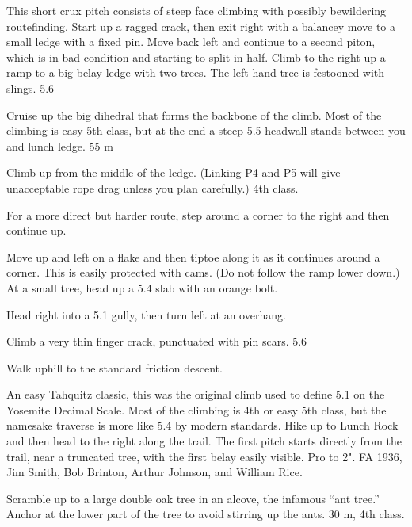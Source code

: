 \documentclass{tahquitz}
\begin{document}
 This short crux pitch consists of steep face climbing with
possibly bewildering routefinding. Start up a ragged crack, then
exit right with a balancey move to a small ledge with a fixed pin.
Move back left and continue to a second piton, which is in bad condition
and starting to split in half. Climb to the right up a ramp to a big belay
ledge with two trees. The left-hand tree is festooned with slings. 5.6

 Cruise up the big dihedral that forms the backbone of the climb.
Most of the climbing is easy 5th class, but at the end a steep 5.5 headwall
stands between you and lunch ledge. 55 m


 Climb up from the middle of the ledge. (Linking P4 and P5 will
give unacceptable rope drag unless you plan carefully.) 4th class.

 For a more direct but harder route, step around a corner
to the right and then continue up.

 Move up and left on a flake
and then tiptoe along it as it continues around a corner.
This is easily protected with cams. (Do not follow the ramp lower down.) At a small
tree, head up a 5.4 slab with an orange bolt.

 Head right into a 5.1 gully, then turn left at an overhang.

 Climb a very thin finger crack, punctuated with pin scars. 5.6

Walk uphill to the standard friction descent.




An easy Tahquitz classic, this was the original climb used to define
5.1 on the Yosemite Decimal Scale. Most of the
climbing is 4th or easy 5th class, but the namesake traverse is more
like 5.4 by modern standards. Hike up to Lunch Rock and then head to the right along the
trail. The first pitch starts directly from the trail, near a 
truncated tree, with the first belay easily visible. Pro to 2". FA
1936, Jim Smith, Bob Brinton, Arthur Johnson, and William Rice.

 Scramble up to a large double oak tree in an alcove, the infamous
``ant tree.'' Anchor at the lower part of the tree to avoid stirring up
the ants. 30 m, 4th class.
\end{document}
